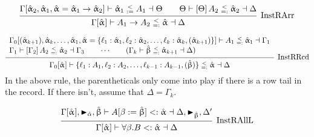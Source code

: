 \documentclass{article}
\newcommand{\spc}{\qquad}
\newcommand{\lbl}{\ell}
\newcommand{\marker}[1]{\RHD_{#1}}
\newcommand{\ev}{\hat}
\newcommand{\evar}[1][]{\ev \upalpha_{#1}}
\newcommand{\evaralt}{\ev \upbeta}
\newcommand{\ctxinout}[3]{#1 \vdash #2 \dashv #3}
\newcommand{\subsume}{<:}
\newcommand{\subsumes}[4]{\ctxinout {#1} {#2 \subsume #3} {#4}}
\newcommand{\instLSymbol}{\;\substack{<\\:=}\;}
\newcommand{\instRSymbol}{\;\substack{<\\=:}\;}
\newcommand{\apply}[1]{\left[#1\right]}
\newcommand{\instL}[4]{#1 \vdash #2 \instLSymbol #3 \dashv #4}
\newcommand{\instR}[4]{#1 \vdash #2 \instRSymbol #3 \dashv #4}
\newcommand{\deduct}[3][]
{
  \begin{prooftree}
    \hypo{#2}
    \infer1[\text{#1}]{#3}
  \end{prooftree}
}
\begin{document}
\[
  \deduct[InstRArr] {\instL{\Gamma[\evar[2], \evar[1], \evar = \evar[1] \to
      \evar[2]]}{\evar[1]}{A_1}{\Theta} \spc \instR{\Theta}{\apply \Theta
      A_2}{\evar[2]}{\Delta} } {\instR{\Gamma[\evar]}{A_1 \to A_2}{\evar}{\Delta}}
\]

\[
  \deduct[InstRRcd]
  {
    \begin{array}{l}
     \instR{\Gamma_0[(\evar[k+1]), \evar[k], \dots, \evar[1], \evar=\{\lbl_1 : \evar[1],
      \lbl_2 : \evar[2], \dots, \lbl_k : \evar[k], (\evar[k+1])\}]}{A_1}{\evar[1]}{\Gamma_1} \\
    \instR{\Gamma_1}{\apply{\Gamma_2} A_2}{\evar[2]}{\Gamma_3} \spc \cdots \spc
     (\instR{\Gamma_k}{\evaralt}{\evar[k+1]}{\Delta})
  \end{array}
  }
  {\instR{\Gamma_0[\evar]}{\{\lbl_1:A_1, \lbl_2 : A_2, \dots, \lbl_{k-1} : A_{k-1}, (\evaralt)\}}{\evar}{\Delta}}
\]
In the above rule, the parentheticals only come into play if there is a row tail
in the record. If there isn't, assume that \(\Delta = \Gamma_k\).

\[
  \deduct[InstRAllL]
  { \subsumes{\Gamma[\evar], \marker{\ev\alpha}, \evaralt}{A[\beta := \evaralt]}{\evar}{\Delta, \marker{\evaralt}, \Delta'} }
  { \subsumes{\Gamma[\evar]}{\forall \beta. B}{\evar}{\Delta} }
\]
\end{document}
